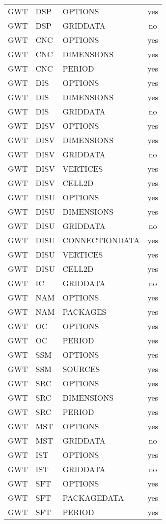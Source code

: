 \begin{longtable}{p{1.5cm} p{1.5cm} p{3cm} c}
\hline
GWT & DSP & OPTIONS & yes \\ 
GWT & DSP & GRIDDATA & no \\ 
\hline
GWT & CNC & OPTIONS & yes \\ 
GWT & CNC & DIMENSIONS & yes \\ 
GWT & CNC & PERIOD & yes \\ 
\hline
GWT & DIS & OPTIONS & yes \\ 
GWT & DIS & DIMENSIONS & yes \\ 
GWT & DIS & GRIDDATA & no \\ 
\hline
GWT & DISV & OPTIONS & yes \\ 
GWT & DISV & DIMENSIONS & yes \\ 
GWT & DISV & GRIDDATA & no \\ 
GWT & DISV & VERTICES & yes \\ 
GWT & DISV & CELL2D & yes \\ 
\hline
GWT & DISU & OPTIONS & yes \\ 
GWT & DISU & DIMENSIONS & yes \\ 
GWT & DISU & GRIDDATA & no \\ 
GWT & DISU & CONNECTIONDATA & yes \\ 
GWT & DISU & VERTICES & yes \\ 
GWT & DISU & CELL2D & yes \\ 
\hline
GWT & IC & GRIDDATA & no \\ 
\hline
GWT & NAM & OPTIONS & yes \\ 
GWT & NAM & PACKAGES & yes \\ 
\hline
GWT & OC & OPTIONS & yes \\ 
GWT & OC & PERIOD & yes \\ 
\hline
GWT & SSM & OPTIONS & yes \\ 
GWT & SSM & SOURCES & yes \\ 
\hline
GWT & SRC & OPTIONS & yes \\ 
GWT & SRC & DIMENSIONS & yes \\ 
GWT & SRC & PERIOD & yes \\ 
\hline
GWT & MST & OPTIONS & yes \\ 
GWT & MST & GRIDDATA & no \\ 
\hline
GWT & IST & OPTIONS & yes \\ 
GWT & IST & GRIDDATA & no \\ 
\hline
GWT & SFT & OPTIONS & yes \\ 
GWT & SFT & PACKAGEDATA & yes \\ 
GWT & SFT & PERIOD & yes \\ 

\end{longtable}
